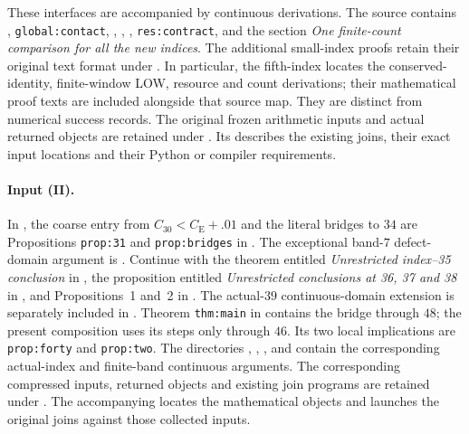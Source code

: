 \documentclass[aop,preprint]{imsart}
\theoremstyle{definition}
\newcommand{\CE}{C_{\mathrm E}}
\numberwithin{equation}{section}
\begin{document}
These interfaces are accompanied by continuous derivations.
The source
contains , \texttt{global:contact},
,
,
, \texttt{res:contract},
and the section \emph{One finite-count comparison for all the new indices}.
The additional small-index proofs retain their original text format under
.
In particular, the fifth-index
locates the conserved-identity, finite-window LOW, resource and count
derivations; their mathematical proof texts are included alongside that
source map. They are distinct from numerical success records.
The original frozen arithmetic inputs and actual returned objects are
retained under .
Its  describes the existing joins,
their exact input locations and their Python or compiler requirements.

\paragraph{Input (II).}
In , the coarse entry from
$C_{30}<\CE+.01$ and the literal bridges to $34$ are
Propositions \texttt{prop:31} and \texttt{prop:bridges} in
. The exceptional band-$7$ defect-domain
argument is .
Continue with the theorem entitled
\emph{Unrestricted index--35 conclusion} in
,
the proposition entitled \emph{Unrestricted conclusions at 36, 37 and 38}
in ,
and Propositions~1 and~2 in .
The actual-$39$ continuous-domain extension is separately included in
.
Theorem \texttt{thm:main} in  contains the
bridge through $48$; the present composition uses its steps only
through $46$. Its two local implications are
\texttt{prop:forty} and \texttt{prop:two}.
The directories , ,
, and  contain the corresponding
actual-index and finite-band continuous arguments.
The corresponding compressed inputs, returned objects and existing
join programs are retained under .
The accompanying  locates the mathematical
objects and launches the original joins against those collected inputs.
\end{document}
